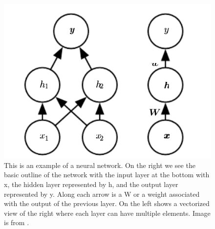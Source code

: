 \begin{figure}[tbh]
\centering
\includegraphics[width=\textwidth]{neural_network.png}
\caption{This is an example of a neural network. On the right we see the basic outline of the network with the input layer at the bottom with x, the hidden layer represented by h, and the output layer represented by y. Along each arrow is a W or a weight associated with the output of the previous layer. On the left shows a vectorized view of the right where each layer can have multiple elements. Image is from \cite{Goodfellow-et-al-2016}.}
\label{fig_neuralNetwork}
\end{figure}    


